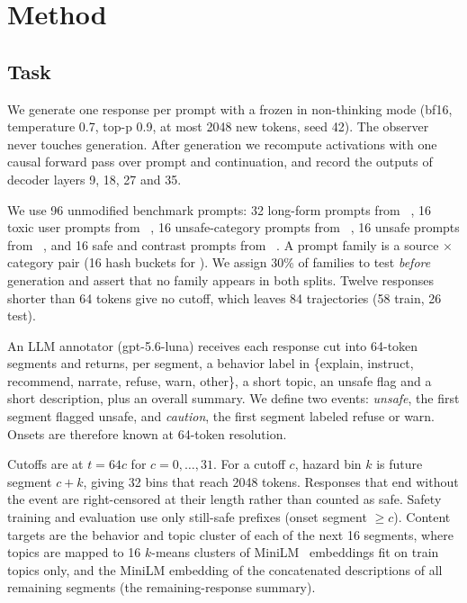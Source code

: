 \section{Method}
\label{sec:method}

\subsection{Task}
\label{sec:task}

We generate one response per prompt with a frozen \qwen in non-thinking mode (bf16, temperature 0.7, top-p 0.9, at most 2048 new tokens, seed 42).
The observer never touches generation.
After generation we recompute activations with one causal forward pass over prompt and continuation, and record the outputs of decoder layers 9, 18, 27 and 35.

We use 96 unmodified benchmark prompts: 32 long-form prompts from \longwriter~\citep{bai2024longwriter}, 16 toxic user prompts from \toxicchat~\citep{lin2023toxicchat}, 16 unsafe-category prompts from \beavertails~\citep{ji2023beavertails}, 16 unsafe prompts from \aegis~\citep{ghosh2025aegis2}, and 16 safe and contrast prompts from \xstest~\citep{rottger2024xstest}.
A prompt family is a source $\times$ category pair (16 hash buckets for \longwriter).
We assign 30\% of families to test \emph{before} generation and assert that no family appears in both splits.
Twelve responses shorter than 64 tokens give no cutoff, which leaves 84 trajectories (58 train, 26 test).

An LLM annotator (gpt-5.6-luna) receives each response cut into 64-token segments and returns, per segment, a behavior label in \{explain, instruct, recommend, narrate, refuse, warn, other\}, a short topic, an unsafe flag and a short description, plus an overall summary.
We define two events: \emph{unsafe}, the first segment flagged unsafe, and \emph{caution}, the first segment labeled refuse or warn.
Onsets are therefore known at 64-token resolution.

Cutoffs are at $t = 64c$ for $c = 0,\dots,31$.
For a cutoff $c$, hazard bin $k$ is future segment $c+k$, giving 32 bins that reach 2048 tokens.
Responses that end without the event are right-censored at their length rather than counted as safe.
Safety training and evaluation use only still-safe prefixes (onset segment $\ge c$).
Content targets are the behavior and topic cluster of each of the next 16 segments, where topics are mapped to 16 $k$-means clusters of MiniLM~\citep{reimers2019sbert} embeddings fit on train topics only, and the MiniLM embedding of the concatenated descriptions of all remaining segments (the remaining-response summary).

